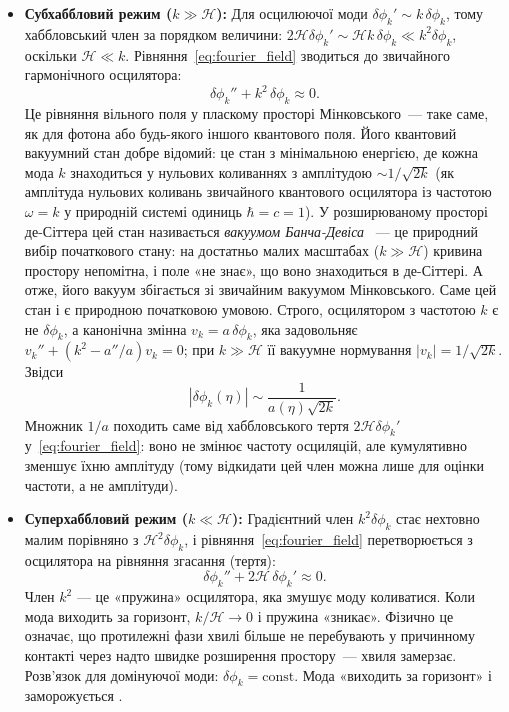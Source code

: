 \begin{itemize}
  \item \textbf{Субхаббловий режим ($k \gg \mathcal{H}$):}
        Для осцилюючої моди $\delta\phi_k' \sim k\,\delta\phi_k$, тому хаббловський член
        за порядком величини: $2\mathcal{H}\delta\phi_k' \sim \mathcal{H}k\,\delta\phi_k \ll k^2\delta\phi_k$,
        оскільки $\mathcal{H} \ll k$. Рівняння~\eqref{eq:fourier_field} зводиться до
        звичайного гармонічного осцилятора:
        \begin{equation*}
          \delta\phi_k'' + k^2\,\delta\phi_k \approx 0.
        \end{equation*}
        Це рівняння вільного поля у пласкому просторі Мінковського~--- таке саме,
        як для фотона або будь-якого іншого квантового поля. Його квантовий
        вакуумний стан добре відомий: це стан з мінімальною енергією, де кожна мода $k$
        знаходиться у нульових коливаннях з амплітудою $\sim 1/\sqrt{2k}$ (як амплітуда нульових коливань звичайного
        квантового осцилятора із частотою $\omega = k$ у природній системі одиниць $\hbar = c = 1$). У розширюваному просторі де-Сіттера цей стан
        називається \emph{вакуумом Банча-Девіса} \cite{bunch_davies_1978}~--- це
        природний вибір початкового стану: на достатньо малих масштабах ($k \gg \mathcal{H}$)
        кривина простору непомітна, і поле «не знає», що воно знаходиться в де-Сіттері.
        А отже, його вакуум збігається зі звичайним вакуумом Мінковського. Саме цей
        стан і є природною початковою умовою. Строго, осцилятором з частотою $k$ є не
        $\delta\phi_k$, а канонічна змінна $v_k = a\,\delta\phi_k$, яка задовольняє
        $v_k'' + (k^2 - a''/a)v_k = 0$; при $k \gg \mathcal{H}$ її вакуумне
        нормування $|v_k| = 1/\sqrt{2k}$. Звідси
        \begin{equation*}
          |\delta\phi_k(\eta)| \sim \frac{1}{a(\eta) \sqrt{2k}}.
        \end{equation*}
        Множник $1/a$ походить саме від хаббловського тертя $2\mathcal{H}\delta\phi_k'$ у~\eqref{eq:fourier_field}:
        воно не змінює частоту осциляцій, але кумулятивно зменшує їхню амплітуду
        (тому відкидати цей член можна лише для оцінки частоти, а не амплітуди).
  \item \textbf{Суперхаббловий режим ($k \ll \mathcal{H}$):}
        Градієнтний член $k^2\delta\phi_k$ стає нехтовно малим порівняно з
        $\mathcal{H}^2\delta\phi_k$, і рівняння~\eqref{eq:fourier_field} перетворюється
        з осцилятора на рівняння згасання (тертя):
        \begin{equation*}
          \delta\phi_k'' + 2\mathcal{H}\,\delta\phi_k' \approx 0.
        \end{equation*}
        Член $k^2$ — це «пружина» осцилятора, яка змушує моду коливатися. Коли мода
        виходить за горизонт, $k/\mathcal{H} \to 0$ і пружина «зникає». Фізично це означає,
        що протилежні фази хвилі більше не перебувають у причинному контакті через надто
        швидке розширення простору~--- хвиля замерзає. Розв'язок для домінуючої моди:
        $\delta\phi_k = \mathrm{const}$. Мода «виходить за горизонт» і заморожується \cite{hawking_1982}.


\end{itemize}
